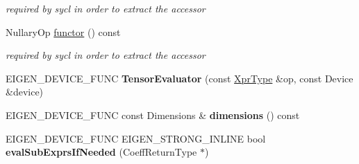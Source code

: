 \begin{DoxyCompactItemize}
\begin{DoxyCompactList}\small\item\em required by sycl in order to extract the accessor \end{DoxyCompactList}\item 
\mbox{\label{struct_eigen_1_1_tensor_evaluator_3_01const_01_tensor_cwise_nullary_op_3_01_nullary_op_00_01_arg_type_01_4_00_01_device_01_4_a9526ddfd7e9532ffdcb3e3ff8defb11f}} 
Nullary\+Op \hyperlink{struct_eigen_1_1_tensor_evaluator_3_01const_01_tensor_cwise_nullary_op_3_01_nullary_op_00_01_arg_type_01_4_00_01_device_01_4_a9526ddfd7e9532ffdcb3e3ff8defb11f}{functor} () const
\begin{DoxyCompactList}\small\item\em required by sycl in order to extract the accessor \end{DoxyCompactList}\item 
\mbox{\label{struct_eigen_1_1_tensor_evaluator_3_01const_01_tensor_cwise_nullary_op_3_01_nullary_op_00_01_arg_type_01_4_00_01_device_01_4_a20deffd5ced1cb581c51cf974dc323b5}} 
E\+I\+G\+E\+N\+\_\+\+D\+E\+V\+I\+C\+E\+\_\+\+F\+U\+NC {\bfseries Tensor\+Evaluator} (const \hyperlink{class_eigen_1_1_tensor_cwise_nullary_op}{Xpr\+Type} \&op, const Device \&device)
\item 
\mbox{\label{struct_eigen_1_1_tensor_evaluator_3_01const_01_tensor_cwise_nullary_op_3_01_nullary_op_00_01_arg_type_01_4_00_01_device_01_4_a03706733c91739d2e5d014c61cac9982}} 
E\+I\+G\+E\+N\+\_\+\+D\+E\+V\+I\+C\+E\+\_\+\+F\+U\+NC const Dimensions \& {\bfseries dimensions} () const
\item 
\mbox{\label{struct_eigen_1_1_tensor_evaluator_3_01const_01_tensor_cwise_nullary_op_3_01_nullary_op_00_01_arg_type_01_4_00_01_device_01_4_a964ac6b836b160da565e8a82e79d7d87}} 
E\+I\+G\+E\+N\+\_\+\+D\+E\+V\+I\+C\+E\+\_\+\+F\+U\+NC E\+I\+G\+E\+N\+\_\+\+S\+T\+R\+O\+N\+G\+\_\+\+I\+N\+L\+I\+NE bool {\bfseries eval\+Sub\+Exprs\+If\+Needed} (Coeff\+Return\+Type $\ast$)

\end{DoxyCompactItemize}
